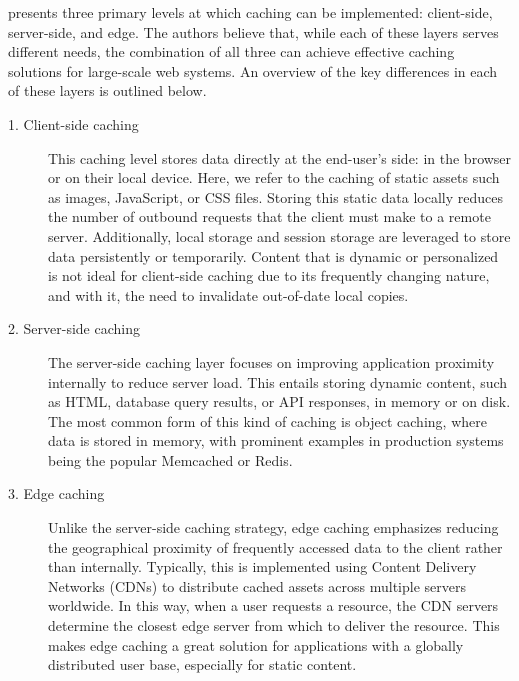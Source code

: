 

\citeauthor{latency-caching} \cite{latency-caching} presents three primary levels at which caching can be implemented: client-side, server-side, and edge. The authors believe that, while each of these layers serves different needs, the combination of all three can achieve effective caching solutions for large-scale web systems. An overview of the key differences in each of these layers is outlined below.

\begin{description}
    \item[1. Client-side caching] This caching level stores data directly at the end-user's side: in the browser or on their local device. Here, we refer to the caching of static assets such as images, JavaScript, or CSS files. Storing this static data locally reduces the number of outbound requests that the client must make to a remote server. Additionally, local storage and session storage are leveraged to store data persistently or temporarily. Content that is dynamic or personalized is not ideal for client-side caching due to its frequently changing nature, and with it, the need to invalidate out-of-date local copies.
    \item[2. Server-side caching] The server-side caching layer focuses on improving application proximity internally to reduce server load. This entails storing dynamic content, such as HTML, database query results, or API responses, in memory or on disk. The most common form of this kind of caching is object caching, where data is stored in memory, with prominent examples in production systems being the popular Memcached or Redis. 
    \item[3. Edge caching] Unlike the server-side caching strategy, edge caching emphasizes reducing the geographical proximity of frequently accessed data to the client rather than internally. Typically, this is implemented using Content Delivery Networks (CDNs) to distribute cached assets across multiple servers worldwide. In this way, when a user requests a resource, the CDN servers determine the closest edge server from which to deliver the resource. This makes edge caching a great solution for applications with a globally distributed user base, especially for static content.
\end{description}

